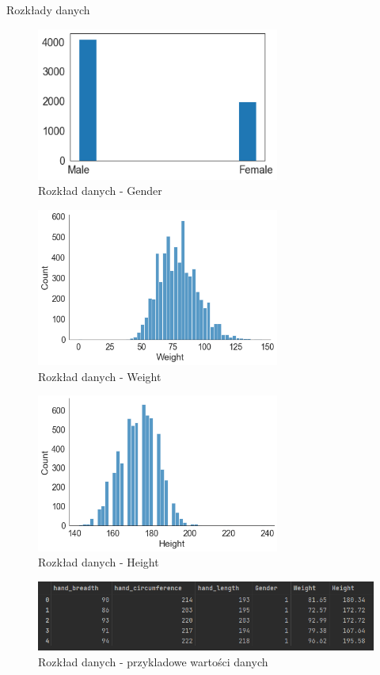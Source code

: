 \documentclass{article}
\begin{document}
\begin{subsection} {Rozkłady danych}
\begin{figure}[H]
    \centering
    \includegraphics[width=8cm]{plec.png}
    \caption{Rozkład danych - Gender}
    \label{fig:my_img}
\end{figure}

\begin{figure}[H]
    \centering
    \includegraphics[width=8cm]{Weight.png}
    \caption{Rozkład danych - Weight}
    \label{fig:my_img}
\end{figure}

\begin{figure}[H]
    \centering
    \includegraphics[width=8cm]{Height.png}
    \caption{Rozkład danych - Height}
    \label{fig:my_img}
\end{figure}

\begin{figure}[H]
    \centering
    \includegraphics[width=12cm]{dane.png}
    \caption{Rozkład danych - przykladowe wartości danych}
    \label{fig:my_img}
\end{figure}


\end{subsection}
\end{document}
